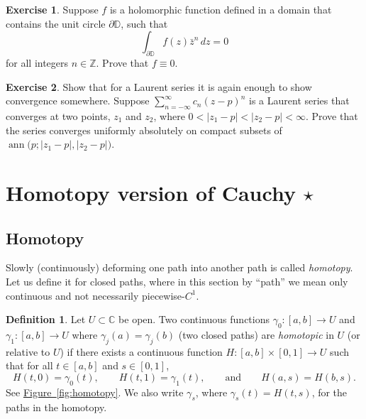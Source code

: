 \documentclass[12pt,openany]{book}
\newcommand{\ann}{\operatorname{ann}}
\newcommand{\sabs}[1]{\lvert {#1} \rvert}
\newcommand{\C}{{\mathbb{C}}}
\newcommand{\Z}{{\mathbb{Z}}}
\newcommand{\D}{{\mathbb{D}}}
\newcommand{\myindex}[1]{#1\index{#1}}
\newcommand{\myquote}[1]{``#1''}
\theoremstyle{plain}
\theoremstyle{remark}
\theoremstyle{definition}
\newtheorem{defn}[thm]{Definition}
\newenvironment{exbox}{%
    \def\FrameCommand{\vrule width 1pt \relax\hspace{10pt}}%
    \MakeFramed{\advance\hsize-\width\FrameRestore}%
}{%
    \endMakeFramed
}
\theoremstyle{exercise}
\newtheorem{exercise}{Exercise}[section]
\theoremstyle{example}
\newcommand{\figureref}[1]{\hyperref[#1]{Figure~\ref*{#1}}}
\begin{document}
\begin{exbox}
\begin{exercise}
Suppose $f$ is a holomorphic function defined in a domain that contains
the unit circle $\partial \D$, such that
\begin{equation*}
\int_{\partial \D} f(z)\bar{z}^n
 \, dz = 0
\end{equation*}
for all integers $n \in \Z$.  Prove that $f \equiv 0$.
\end{exercise}

\begin{exercise}
Show that for a Laurent series it is again enough to show convergence
somewhere.  Suppose $\sum_{n=-\infty}^\infty c_n {(z-p)}^n$ is a Laurent
series that converges at two points, $z_1$ and $z_2$, where
$0 < \sabs{z_1-p} < \sabs{z_2-p} < \infty$.
Prove that the series converges uniformly absolutely on compact subsets
of $\ann\bigl(p;\sabs{z_1-p},\sabs{z_2-p}\bigr)$.
\end{exercise}
\end{exbox}


\section{Homotopy version of Cauchy \texorpdfstring{$\star$}{*}}

\subsection{Homotopy}

Slowly (continuously) deforming one path into another path
is called \emph{\myindex{homotopy}}.  Let us
define it for closed paths,
where in this section by \myquote{path} we mean only
continuous and not necessarily piecewise-$C^1$.

\begin{defn}\label{defn:homotopy}
Let $U \subset \C$ be open.
Two continuous functions
$\gamma_0 \colon [a,b] \to U$ and
$\gamma_1 \colon [a,b] \to U$
where $\gamma_j(a)=\gamma_j(b)$ (two closed paths)
are \emph{\myindex{homotopic}} in $U$
(or relative to $U$) if there exists a continuous function
$H \colon [a,b] \times [0,1] \to U$ such that
for all $t \in [a,b]$ and $s \in [0,1]$,
\begin{equation*}
H(t,0) = \gamma_0(t), \qquad
H(t,1) = \gamma_1(t), \qquad \text{and} \qquad
H(a,s) = H(b,s) .
\end{equation*}
See \figureref{fig:homotopy}.
We also write $\gamma_s$, where $\gamma_s(t) = H(t,s)$, for the paths in the homotopy.
\end{defn}
\end{document}
